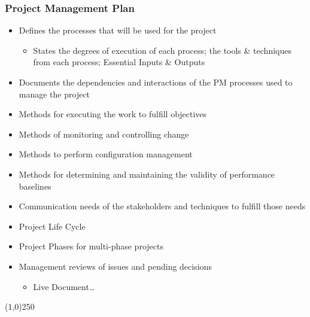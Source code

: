 \begin{frame}
\frametitle{Project Management Plan}
\begin{itemize}
	\item Defines the processes that will be used for the project
		\begin{itemize}
			\item States the degrees of execution of each process; the tools \& techniques from each process; Essential Inputs \& Outputs
		\end{itemize}
	\item Documents the dependencies and interactions of the PM processes used to manage the project
	\item Methods for executing the work to fulfill objectives
	\item Methods of monitoring and controlling change
	\item Methods to perform configuration management
	\item Methods for determining and maintaining the validity of performance baselines
	\item Communication needs of the stakeholders and techniques to fulfill those needs
	\item Project Life Cycle
	\item Project Phases for multi-phase projects
	\item Management reviews of issues and pending decisions
		\begin{itemize}
			\item Live Document\ldots
		\end{itemize}
\end{itemize}
\end{frame}\begin{center}\line(1,0){250}\end{center}
%
%


